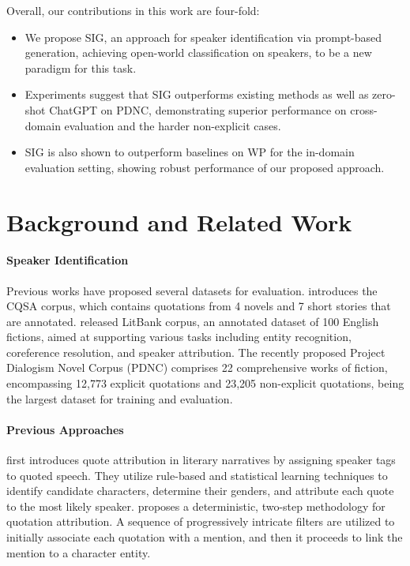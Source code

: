 \documentclass[letterpaper]{article} %
\begin{document}
Overall, our contributions in this work are four-fold:
\begin{itemize}[noitemsep,nolistsep,leftmargin=*]
    \item We propose SIG, an approach for speaker identification via prompt-based generation, achieving open-world classification on speakers, to be a new paradigm for this task.
    \item Experiments suggest that SIG outperforms existing methods as well as zero-shot ChatGPT on PDNC, demonstrating superior performance on cross-domain evaluation and the harder non-explicit cases.
    \item SIG is also shown to outperform baselines on WP for the in-domain evaluation setting, showing robust performance of our proposed approach.
\end{itemize}


\section{Background and Related Work}




\paragraph{Speaker Identification}
Previous works have proposed several datasets for evaluation. \citet{DBLP:conf/aaai/ElsonM10} introduces the CQSA corpus, which contains quotations from 4 novels and 7 short stories that are annotated. \citet{DBLP:conf/lrec/BammanLM20} released LitBank corpus, an annotated dataset of 100 English fictions, aimed at supporting various tasks including entity recognition, coreference resolution, and speaker attribution.
The recently proposed Project Dialogism Novel Corpus (PDNC) \citep{DBLP:conf/lrec/VishnubhotlaHH22} comprises 22 comprehensive works of fiction, encompassing 12,773 explicit quotations and 23,205 non-explicit quotations, being the largest dataset for training and evaluation.

\paragraph{Previous Approaches}
\citet{DBLP:conf/aaai/ElsonM10} first introduces quote attribution in literary narratives by assigning speaker tags to quoted speech. They utilize rule-based and statistical learning techniques to identify candidate characters, determine their genders, and attribute each quote to the most likely speaker.
\citet{DBLP:conf/eacl/JurafskyCMF17}  proposes a deterministic, two-step methodology for quotation attribution. A sequence of progressively intricate filters are utilized to initially associate each quotation with a mention, and then it proceeds to link the mention to a character entity.
\end{document}
